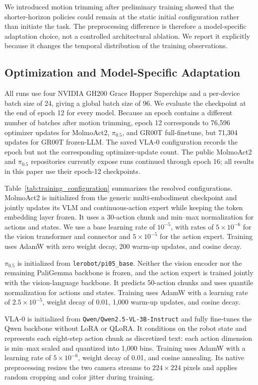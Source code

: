 We introduced motion trimming after preliminary training showed that the shorter-horizon policies could remain at the static initial configuration rather than initiate the task. The preprocessing difference is therefore a model-specific adaptation choice, not a controlled architectural ablation. We report it explicitly because it changes the temporal distribution of the training observations.

\subsection{Optimization and Model-Specific Adaptation}

All runs use four NVIDIA GH200 Grace Hopper Superchips and a per-device batch size of 24, giving a global batch size of 96. We evaluate the checkpoint at the end of epoch 12 for every model. Because an epoch contains a different number of batches after motion trimming, epoch 12 corresponds to 76,596 optimizer updates for MolmoAct2, $\pi_{0.5}$, and GR00T full-finetune, but 71,304 updates for GR00T frozen-LLM. The saved VLA-0 configuration records the epoch but not the corresponding optimizer-update count. The public MolmoAct2 and $\pi_{0.5}$ repositories currently expose runs continued through epoch 16; all results in this paper use their epoch-12 checkpoints.

Table~\ref{tab:training_configuration} summarizes the resolved configurations. MolmoAct2 is initialized from the generic multi-embodiment checkpoint and jointly updates its VLM and continuous-action expert while keeping the token embedding layer frozen. It uses a 30-action chunk and min--max normalization for actions and states. We use a base learning rate of $10^{-5}$, with rates of $5\times10^{-6}$ for the vision transformer and connector and $5\times10^{-5}$ for the action expert. Training uses AdamW with zero weight decay, 200 warm-up updates, and cosine decay.

$\pi_{0.5}$ is initialized from \texttt{lerobot/pi05\_base}. Neither the vision encoder nor the remaining PaliGemma backbone is frozen, and the action expert is trained jointly with the vision-language backbone. It predicts 50-action chunks and uses quantile normalization for actions and states. Training uses AdamW with a learning rate of $2.5\times10^{-5}$, weight decay of 0.01, 1,000 warm-up updates, and cosine decay.

VLA-0 is initialized from \texttt{Qwen/Qwen2.5-VL-3B-Instruct} and fully fine-tunes the Qwen backbone without LoRA or QLoRA. It conditions on the robot state and represents each eight-step action chunk as discretized text: each action dimension is min--max scaled and quantized into 1,000 bins. Training uses AdamW with a learning rate of $5\times10^{-6}$, weight decay of 0.01, and cosine annealing. Its native preprocessing resizes the two camera streams to $224\times224$ pixels and applies random cropping and color jitter during training.

